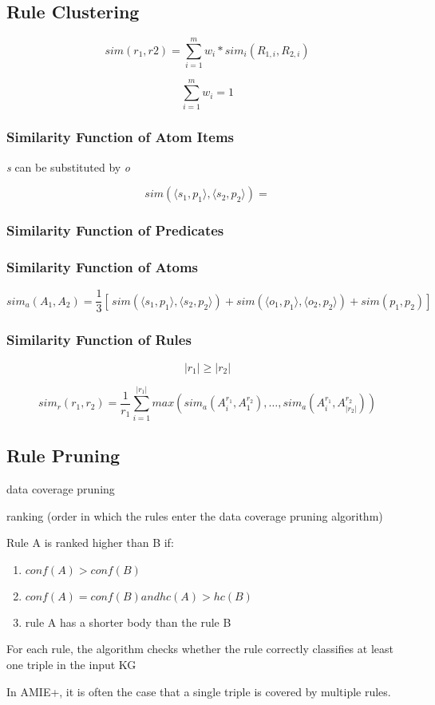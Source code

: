 \subsection{Rule Clustering}

$$sim(r_{1}, r{2}) = \sum_{i = 1}^m w_{i} * sim_{i}(R_{1,i}, R_{2,i})$$

$$\sum_{i = 1}^m w_{i} = 1$$

\subsubsection{Similarity Function of Atom Items}

\textit{s} can be substituted by \textit{o}

$$sim ( \langle s_{1}, p_{1} \rangle, \langle s_{2}, p_{2} \rangle ) = $$


\subsubsection{Similarity Function of Predicates}

\subsubsection{Similarity Function of Atoms}

$$sim_a(A_{1}, A_{2}) = \frac{1}{3} [ \, sim(\langle s_{1}, p_{1} \rangle, \langle s_{2}, p_{2} \rangle) + sim(\langle o_{1}, p_{1} \rangle, \langle o_{2}, p_{2} \rangle) + sim(p_{1}, p_{2}) ] \,$$

\subsubsection{Similarity Function of Rules}

$$|r_{1}| \geq |r_{2}|$$

$$ sim_{r}(r_{1}, r_{2}) = \frac{1}{r_{1}} \sum_{i = 1}^{|r_{1}|} max(sim_{a}(A_{i}^{r_{1}}, A_{1}^{r_{2}}), \ldots, sim_{a}(A_{i}^{r_{1}}, A_{|r_{2}|}^{r_{2}}))  $$

\subsection{Rule Pruning}

data coverage pruning

ranking (order in which the rules enter the data coverage pruning algorithm)

Rule A is ranked higher than B if:

\begin{enumerate}
    \item $conf(A) > conf(B)$
    \item $conf(A) = conf(B) and hc(A) > hc(B)$
    \item rule A has a shorter body than the rule B
\end{enumerate}

For each rule, the algorithm checks whether the rule correctly classifies at least one triple in the input KG

In AMIE+, it is often the case that a single triple is covered by multiple rules.


